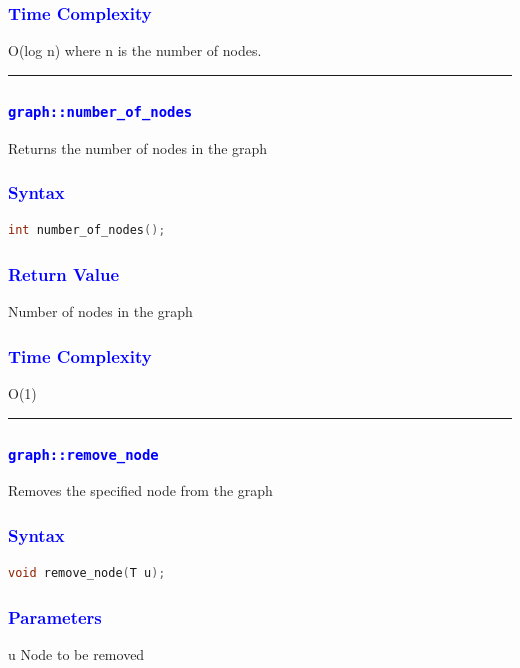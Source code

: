 \documentclass[11pt,a4paper]{article}
\begin{document}
\subsubsection*{\textcolor{blue}{ \large {Time Complexity}}}
O(log n) where n is the number of nodes.
\\
\rule{17cm}{0.1mm}



\subsubsection*{\textcolor{blue}{ \Large \texttt{graph::number\_of\_nodes}}}

Returns the number of nodes in the graph

\subsubsection*{\textcolor{blue}{ \large {Syntax}}}
\begin{lstlisting}[language=C++]
 int number_of_nodes();

\end{lstlisting}
\subsubsection*{\textcolor{blue}{ \large {Return Value
}}}
Number of nodes in the graph

\subsubsection*{\textcolor{blue}{ \large {Time Complexity}}}
O(1)
\\
\rule{17cm}{0.1mm}


\subsubsection*{\textcolor{blue}{ \Large \texttt{graph::remove\_node}}}
Removes the specified node from the graph

\subsubsection*{\textcolor{blue}{ \large {Syntax}}}
\begin{lstlisting}[language=C++]
 void remove_node(T u);

\end{lstlisting}
\subsubsection*{\textcolor{blue}{ \large {Parameters
}}}
u
Node to be removed
\end{document}
